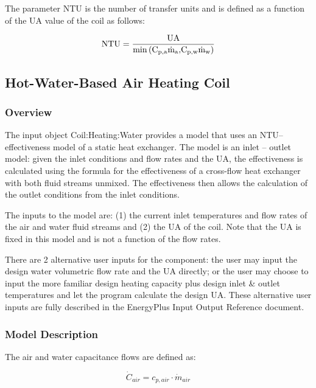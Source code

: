 The parameter NTU is the number of transfer units and is defined as a function of the UA value of the coil as follows:

\begin{equation}
{\rm{NTU}} = \frac{{{\rm{UA}}}}{{{\rm{min}}\left( {{{\rm{C}}_{{\rm{p,a}}}}{{{\rm{\dot m}}}_{\rm{a}}}{\rm{,}}{{\rm{C}}_{{\rm{p,w}}}}{{{\rm{\dot m}}}_{\rm{w}}}} \right)}}
\end{equation}

\subsection{Hot-Water-Based Air Heating Coil}\label{hot-water-based-air-heating-coil}

\subsubsection{Overview}\label{overview-010}

The input object Coil:Heating:Water provides a model that uses an NTU--effectiveness model of a static heat exchanger. The model is an inlet -- outlet model: given the inlet conditions and flow rates and the UA, the effectiveness is calculated using the formula for the effectiveness of a cross-flow heat exchanger with both fluid streams unmixed. The effectiveness then allows the calculation of the outlet conditions from the inlet conditions.

The inputs to the model are: (1) the current inlet temperatures and flow rates of the air and water fluid streams and (2) the UA of the coil. Note that the UA is fixed in this model and is not a function of the flow rates.

There are 2 alternative user inputs for the component: the user may input the design water volumetric flow rate and the UA directly; or the user may choose to input the more familiar design heating capacity plus design inlet \& outlet temperatures and let the program calculate the design UA. These alternative user inputs are fully described in the EnergyPlus Input Output Reference document.

\subsubsection{Model Description}\label{model-description-1-004}

The air and water capacitance flows are defined as:

\begin{equation}
{\dot C_{air}} = {c_{p,air}}\cdot {\dot m_{air}}
\end{equation}

